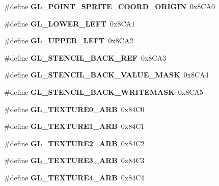 \begin{DoxyCompactItemize}
\item 
\#define {\bfseries G\+L\+\_\+\+P\+O\+I\+N\+T\+\_\+\+S\+P\+R\+I\+T\+E\+\_\+\+C\+O\+O\+R\+D\+\_\+\+O\+R\+I\+G\+I\+N}~0x8\+C\+A0\label{_s_d_l__opengl_8h_af7bfdf67a9b594c8e33ca5cdd5dcfb5d}

\item 
\#define {\bfseries G\+L\+\_\+\+L\+O\+W\+E\+R\+\_\+\+L\+E\+F\+T}~0x8\+C\+A1\label{_s_d_l__opengl_8h_ae8b5c2980cf1e2a2ff8d940b57cdcd1a}

\item 
\#define {\bfseries G\+L\+\_\+\+U\+P\+P\+E\+R\+\_\+\+L\+E\+F\+T}~0x8\+C\+A2\label{_s_d_l__opengl_8h_a7bd958bbbacde2a29bfd74d50e1ddac7}

\item 
\#define {\bfseries G\+L\+\_\+\+S\+T\+E\+N\+C\+I\+L\+\_\+\+B\+A\+C\+K\+\_\+\+R\+E\+F}~0x8\+C\+A3\label{_s_d_l__opengl_8h_a5c9a40aceb53d69be5ffaff15c7d7c3b}

\item 
\#define {\bfseries G\+L\+\_\+\+S\+T\+E\+N\+C\+I\+L\+\_\+\+B\+A\+C\+K\+\_\+\+V\+A\+L\+U\+E\+\_\+\+M\+A\+S\+K}~0x8\+C\+A4\label{_s_d_l__opengl_8h_a7f03d101f47e0c779761cf20b8652dad}

\item 
\#define {\bfseries G\+L\+\_\+\+S\+T\+E\+N\+C\+I\+L\+\_\+\+B\+A\+C\+K\+\_\+\+W\+R\+I\+T\+E\+M\+A\+S\+K}~0x8\+C\+A5\label{_s_d_l__opengl_8h_a3e0903a295456617def915dbc0932a3a}

\item 
\#define {\bfseries G\+L\+\_\+\+T\+E\+X\+T\+U\+R\+E0\+\_\+\+A\+R\+B}~0x84\+C0\label{_s_d_l__opengl_8h_a52f7e4ad7d25b51800d52f7cf4459a39}

\item 
\#define {\bfseries G\+L\+\_\+\+T\+E\+X\+T\+U\+R\+E1\+\_\+\+A\+R\+B}~0x84\+C1\label{_s_d_l__opengl_8h_affdf381031ef9f48ddf76805cdf8d0a5}

\item 
\#define {\bfseries G\+L\+\_\+\+T\+E\+X\+T\+U\+R\+E2\+\_\+\+A\+R\+B}~0x84\+C2\label{_s_d_l__opengl_8h_a5c56f2e8fd1ca5abe5f47e76036ec2d5}

\item 
\#define {\bfseries G\+L\+\_\+\+T\+E\+X\+T\+U\+R\+E3\+\_\+\+A\+R\+B}~0x84\+C3\label{_s_d_l__opengl_8h_ad379be7cb9fd935261564bca80457188}

\item 
\#define {\bfseries G\+L\+\_\+\+T\+E\+X\+T\+U\+R\+E4\+\_\+\+A\+R\+B}~0x84\+C4\label{_s_d_l__opengl_8h_adbe2a3237c679830c2d077f20bef8b2e}


\end{DoxyCompactItemize}
